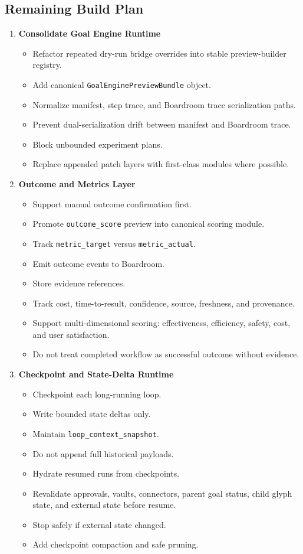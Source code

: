 \subsection{Remaining Build Plan}

\begin{enumerate}
  \item \textbf{Consolidate Goal Engine Runtime}
  \begin{itemize}
    \item Refactor repeated dry-run bridge overrides into stable preview-builder registry.
    \item Add canonical \texttt{GoalEnginePreviewBundle} object.
    \item Normalize manifest, step trace, and Boardroom trace serialization paths.
    \item Prevent dual-serialization drift between manifest and Boardroom trace.
    \item Block unbounded experiment plans.
    \item Replace appended patch layers with first-class modules where possible.
  \end{itemize}

  \item \textbf{Outcome and Metrics Layer}
  \begin{itemize}
    \item Support manual outcome confirmation first.
    \item Promote \texttt{outcome\_score} preview into canonical scoring module.
    \item Track \texttt{metric\_target} versus \texttt{metric\_actual}.
    \item Emit outcome events to Boardroom.
    \item Store evidence references.
    \item Track cost, time-to-result, confidence, source, freshness, and provenance.
    \item Support multi-dimensional scoring: effectiveness, efficiency, safety, cost, and user satisfaction.
    \item Do not treat completed workflow as successful outcome without evidence.
  \end{itemize}

  \item \textbf{Checkpoint and State-Delta Runtime}
  \begin{itemize}
    \item Checkpoint each long-running loop.
    \item Write bounded state deltas only.
    \item Maintain \texttt{loop\_context\_snapshot}.
    \item Do not append full historical payloads.
    \item Hydrate resumed runs from checkpoints.
    \item Revalidate approvals, vaults, connectors, parent goal status, child glyph state, and external state before resume.
    \item Stop safely if external state changed.
    \item Add checkpoint compaction and safe pruning.
  \end{itemize}


\end{enumerate}
